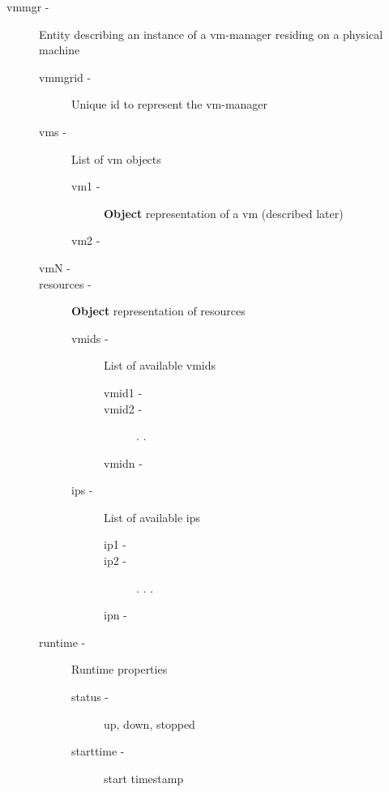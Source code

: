 \documentclass[11pt]{article}
\begin{document}
\begin{description}
\item [vmmgr -] Entity describing an instance of a vm-manager
                   residing on a physical machine

\begin{description}
\item [vmmgrid -] Unique id to represent the vm-manager
\item [vms -] List of vm objects

\begin{description}
\item [vm1 -] \textbf{Object} representation of a vm (described later)
\item [vm2 -]
\end{description}

\item [vmN -]
\item [resources -] \textbf{Object} representation of resources

\begin{description}
\item [vmids -] List of available vmids

\begin{description}
\item [vmid1 -]
\item [vmid2 -]
                       .
                       .
\item [vmidn -]
\end{description}

\item [ips -] List of available ips

\begin{description}
\item [ip1 -]
\item [ip2 -]
                       .
                       .
                       .
\item [ipn -]
\end{description}

\end{description}

\item [runtime -] Runtime properties

\begin{description}
\item [status -] up, down, stopped
\item [starttime -] start timestamp
\end{description}

\end{description}

\end{description}
\end{document}

